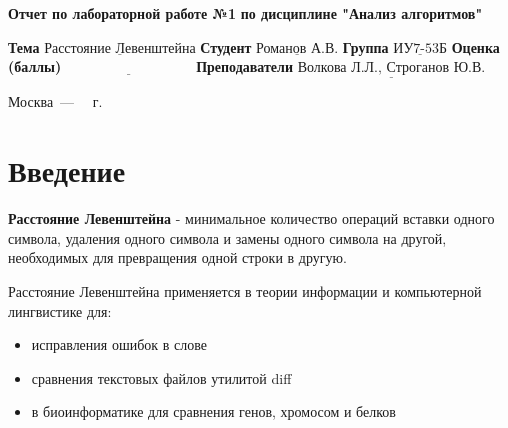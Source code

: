 \documentclass[12pt]{report}
\begin{document}
\begin{titlepage}
	
	\begin{center}
		\noindent\begin{minipage}{1.3\textwidth}\centering
			\Large\textbf{  Отчет по лабораторной работе №1}\newline
			\textbf{по дисциплине "Анализ алгоритмов"}\newline\newline
		\end{minipage}
	\end{center}
	
	\noindent\textbf{Тема} $\underline{\text{Расстояние Левенштейна}}$\newline\newline
	\noindent\textbf{Студент} $\underline{\text{Романов А.В.}}$\newline\newline
	\noindent\textbf{Группа} $\underline{\text{ИУ7-53Б}}$\newline\newline
	\noindent\textbf{Оценка (баллы)} $\underline{\text{~~~~~~~~~~~~~~~~~~~~~~~~~~~}}$\newline\newline
	\noindent\textbf{Преподаватели} $\underline{\text{Волкова Л.Л., Строганов Ю.В.}}$\newline\newline\newline
	
	\begin{center}
		\vfill
		Москва~---~\the\year
		~г.
	\end{center}
\end{titlepage}


\tableofcontents

\newpage
\chapter*{Введение}
\textbf{Расстояние Левенштейна} - минимальное количество операций вставки одного символа, удаления одного символа и замены одного символа на другой, необходимых для превращения одной строки в другую.
\newline

Расстояние Левенштейна применяется в теории информации и компьютерной лингвистике для:

\begin{itemize}
	\item исправления ошибок в слове
	\item сравнения текстовых файлов утилитой diff
	\item в биоинформатике для сравнения генов, хромосом и белков
\end{itemize}
\end{document}
